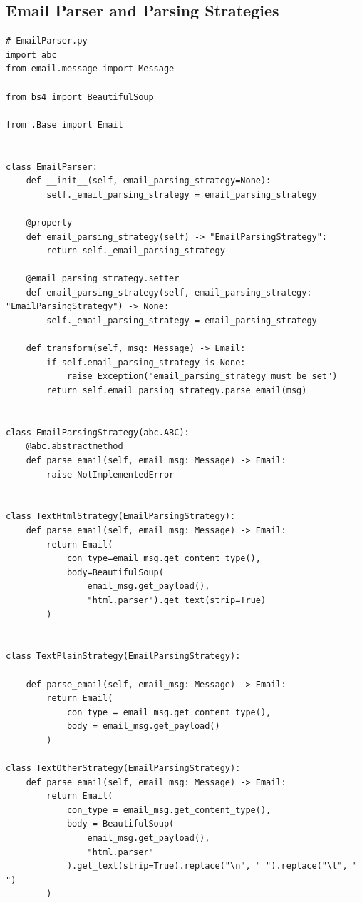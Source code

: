 \documentclass[10pt,a4paper]{article}
\begin{document}
\subsection{Email Parser and Parsing Strategies}
\begin{lstlisting}
# EmailParser.py
import abc
from email.message import Message

from bs4 import BeautifulSoup

from .Base import Email


class EmailParser:
    def __init__(self, email_parsing_strategy=None):
        self._email_parsing_strategy = email_parsing_strategy
    
    @property
    def email_parsing_strategy(self) -> "EmailParsingStrategy":
        return self._email_parsing_strategy

    @email_parsing_strategy.setter
    def email_parsing_strategy(self, email_parsing_strategy: "EmailParsingStrategy") -> None:
        self._email_parsing_strategy = email_parsing_strategy
    
    def transform(self, msg: Message) -> Email:
        if self.email_parsing_strategy is None:
            raise Exception("email_parsing_strategy must be set")
        return self.email_parsing_strategy.parse_email(msg)


class EmailParsingStrategy(abc.ABC):
    @abc.abstractmethod
    def parse_email(self, email_msg: Message) -> Email:
        raise NotImplementedError


class TextHtmlStrategy(EmailParsingStrategy):
    def parse_email(self, email_msg: Message) -> Email:
        return Email(
            con_type=email_msg.get_content_type(), 
            body=BeautifulSoup(
                email_msg.get_payload(),
                "html.parser").get_text(strip=True)
        )


class TextPlainStrategy(EmailParsingStrategy):

    def parse_email(self, email_msg: Message) -> Email:
        return Email(
            con_type = email_msg.get_content_type(),
            body = email_msg.get_payload()
        )

class TextOtherStrategy(EmailParsingStrategy):
    def parse_email(self, email_msg: Message) -> Email:
        return Email(
            con_type = email_msg.get_content_type(),
            body = BeautifulSoup(
                email_msg.get_payload(),
                "html.parser"
            ).get_text(strip=True).replace("\n", " ").replace("\t", " ")
        )
\end{lstlisting}
\end{document}

